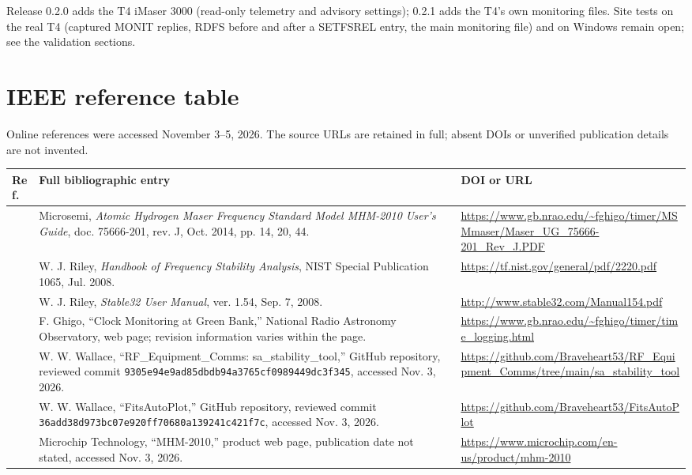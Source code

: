 \documentclass[11pt,a4paper]{article}
\begin{document}
Release 0.2.0 adds the T4 iMaser 3000 (read-only telemetry and advisory
settings); 0.2.1 adds the T4's own monitoring files. Site tests on the real T4
(captured MONIT replies, RDFS before and after a SETFSREL entry, the main
monitoring file) and on Windows remain open; see the validation sections.

\section{IEEE reference table}
Online references were accessed November 3--5, 2026. The source URLs are retained
in full; absent DOIs or unverified publication details are not invented.

\small
\begin{longtable}{@{}p{.05\linewidth}p{.53\linewidth}p{.34\linewidth}@{}}
\toprule
Ref. & Full bibliographic entry & DOI or URL\\
\midrule
\endhead
[1] & Microsemi, \textit{Atomic Hydrogen Maser Frequency Standard Model
MHM-2010 User's Guide}, doc. 75666-201, rev. J, Oct. 2014, pp. 14, 20, 44.
& \url{https://www.gb.nrao.edu/~fghigo/timer/MSMmaser/Maser_UG_75666-201_Rev_J.PDF}\\[5pt]
[2] & W. J. Riley, \textit{Handbook of Frequency Stability Analysis},
NIST Special Publication 1065, Jul. 2008.
& \url{https://tf.nist.gov/general/pdf/2220.pdf}\\[5pt]
[3] & W. J. Riley, \textit{Stable32 User Manual}, ver. 1.54,
Sep. 7, 2008.
& \url{http://www.stable32.com/Manual154.pdf}\\[5pt]
[4] & F. Ghigo, ``Clock Monitoring at Green Bank,'' National Radio Astronomy
Observatory, web page; revision information varies within the page.
& \url{https://www.gb.nrao.edu/~fghigo/timer/time_logging.html}\\[5pt]
[5] & W. W. Wallace, ``RF\_Equipment\_Comms: sa\_stability\_tool,''
GitHub repository, reviewed commit
\texttt{9305e94e9ad85dbdb94a3765cf0989449dc3f345}, accessed Nov. 3, 2026.
& \url{https://github.com/Braveheart53/RF_Equipment_Comms/tree/main/sa_stability_tool}\\[5pt]
[6] & W. W. Wallace, ``FitsAutoPlot,'' GitHub repository, reviewed commit
\texttt{36add38d973bc07e920ff70680a139241c421f7c}, accessed Nov. 3, 2026.
& \url{https://github.com/Braveheart53/FitsAutoPlot}\\[5pt]
[7] & Microchip Technology, ``MHM-2010,'' product web page, publication date
not stated, accessed Nov. 3, 2026.
& \url{https://www.microchip.com/en-us/product/mhm-2010}\\[5pt]

\end{longtable}
\end{document}
